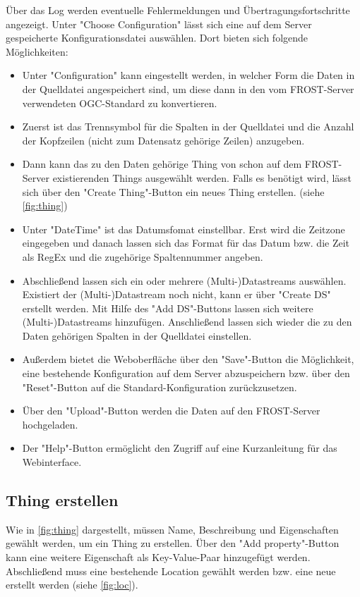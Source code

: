 \documentclass[12 pt]{article}
\begin{document}
Über das Log werden eventuelle Fehlermeldungen und Übertragungsfortschritte angezeigt. Unter "{Choose Configuration}" lässt sich eine auf dem Server gespeicherte Konfigurationsdatei auswählen. Dort bieten sich folgende Möglichkeiten:
\begin{itemize}
\item Unter "{Configuration}" kann eingestellt werden, in welcher Form die Daten in der Quelldatei angespeichert sind, um diese dann in den vom FROST-Server verwendeten OGC-Standard zu konvertieren.
\item Zuerst ist das Trennsymbol für die Spalten in der Quelldatei und die Anzahl der Kopfzeilen (nicht zum Datensatz gehörige Zeilen) anzugeben. 
\item Dann kann das zu den Daten gehörige Thing von schon auf dem FROST-Server existierenden Things ausgewählt werden. Falls es benötigt wird, lässt sich über den "{Create Thing}"{-Button} ein neues Thing erstellen. (siehe \cref{fig:thing})
\item Unter "{DateTime}"{ ist} das Datumsfomat einstellbar. Erst wird die Zeitzone eingegeben und danach lassen sich das Format für das Datum bzw. die Zeit als RegEx und die zugehörige Spaltennummer angeben.
\item Abschließend lassen sich ein oder mehrere (Multi-)Datastreams auswählen. Existiert der (Multi-)Datastream noch nicht, kann er über "{Create DS}"{ erstellt} werden. Mit Hilfe des "{Add DS}"{-Buttons} lassen sich weitere (Multi-)Datastreams hinzufügen. Anschließend lassen sich wieder die zu den Daten gehörigen Spalten in der Quelldatei einstellen.
\item Außerdem bietet die Weboberfläche über den "{Save}"{-Button} die Möglichkeit, eine bestehende Konfiguration auf dem Server abzuspeichern bzw. über den "{Reset}"{-Button} auf die Standard-Konfiguration zurückzusetzen.
\item Über den "{Upload}"{-Button} werden die Daten auf den FROST-Server hochgeladen.
\item Der "{Help}"{-Button} ermöglicht den Zugriff auf eine Kurzanleitung für das Webinterface.
\end{itemize}

\subsection{Thing erstellen}
Wie in \cref{fig:thing} dargestellt, müssen Name, Beschreibung und Eigenschaften gewählt werden, um ein Thing zu erstellen. Über den "{Add property}"{-Button} kann eine weitere Eigenschaft als Key-Value-Paar hinzugefügt werden. Abschließend muss eine bestehende Location gewählt werden bzw. eine neue erstellt werden (siehe \cref{fig:loc}).
\end{document}
